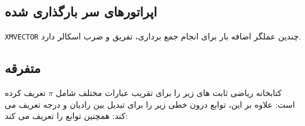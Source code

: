 \textbf{\vspace{-60pt}}
\subsection{\textbf{اپراتورهای سر بارگذاری شده}}
{
    \Large
    \begin{spacing}{1.5}
        \texttt{XMVECTOR} چندین عملگر اضافه بار برای انجام جمع برداری، تفریق و ضرب اسکالر دارد.
        \textbf{\vspace{6pt}}
        \lr{}
    \end{spacing}
}

\textbf{\vspace{-65pt}}
\subsection{\textbf{متفرقه}}
{
    \Large
    \begin{spacing}{1.5}
        کتابخانه ریاضی  ثابت های زیر را برای تقریب عبارات مختلف شامل $\pi$ تعریف کرده است:
        \textbf{\vspace{6pt}}
        \lr{}
        \textbf{\vspace{6pt}}
        علاوه بر این، توابع درون خطی زیر را برای تبدیل بین رادیان و درجه تعریف می کند:
        \textbf{\vspace{6pt}}
        \lr{}
        \textbf{\vspace{6pt}}
        همچنین توابع  را تعریف می کند:
        \textbf{\vspace{6pt}}
        \lr{}
    \end{spacing}
}

\textbf{\vspace{-60pt}}
